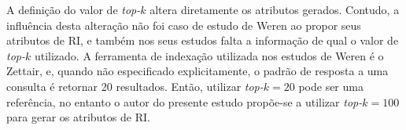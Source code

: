     
    A definição do valor de \textit{top-$k$} altera diretamente os atributos gerados. 
    Contudo, a influência desta alteração não foi caso de estudo de Weren ao propor seus atributos de RI, e também nos seus estudos falta a informação de qual o valor de \textit{top-$k$} utilizado.
    A ferramenta de indexação utilizada nos estudos de Weren é o Zettair, e, quando não especificado explicitamente, o padrão de resposta a uma consulta é retornar 20 resultados.
    Então, utilizar \textit{top-$k = 20$} pode ser uma referência, no entanto o autor do presente estudo propõe-se a utilizar \textit{top-$k = 100$} para gerar os atributos de RI.
    
    



